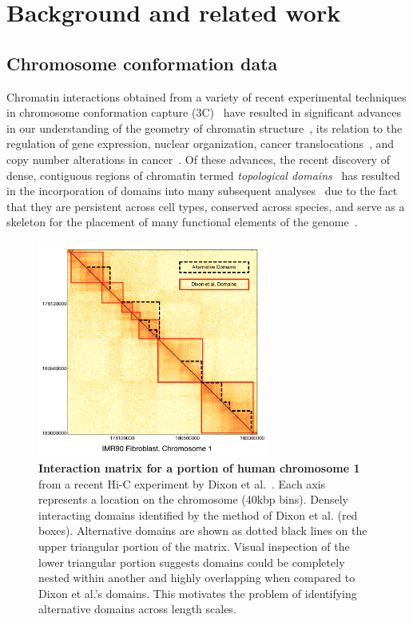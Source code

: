 \documentclass[12pt]{cmuthesis}
\begin{document}
\section{Background and related work}

  \subsection{Chromosome conformation data}

  Chromatin interactions obtained from a variety of recent experimental techniques in chromosome conformation capture (3C)~\cite{DeWit2012} have resulted in significant advances in our understanding of the geometry of chromatin structure~\cite{Gibcus2013}, its relation to the regulation of gene expression, nuclear organization, cancer translocations~\cite{Cavalli2013}, and copy number alterations in cancer~\cite{Fudenberg2011}.  Of these advances, the recent discovery of dense, contiguous regions of chromatin termed \emph{topological domains}~\cite{Dixon2012} has resulted in the incorporation of domains into many subsequent analyses~\cite{Hou2012,Kolbl2012,Lin2012} due to the fact that they are persistent across cell types, conserved across species, and serve as a skeleton for the placement of many functional elements of the genome~\cite{Bickmore2013a,Tanay2013}.


  \begin{figure}[t!]
    \begin{center}
      \includegraphics[width=3in]{figures/HeatMapFig}
    \end{center}
    \caption{\textbf{Interaction matrix for a portion of human chromosome 1} from a recent Hi-C experiment by Dixon et al.~\cite{Dixon2012}. Each axis represents a location on the chromosome (40kbp bins).  Densely interacting domains identified by the method of Dixon et al. (red boxes).  Alternative domains are shown as dotted black lines on the upper triangular portion of the matrix.  Visual inspection of the lower triangular portion suggests domains could be completely nested within another and highly overlapping when compared to Dixon et al.'s domains. This motivates the problem of identifying alternative domains across length scales.}
    \label{armatus:heatmap}
  \end{figure}
\end{document}
